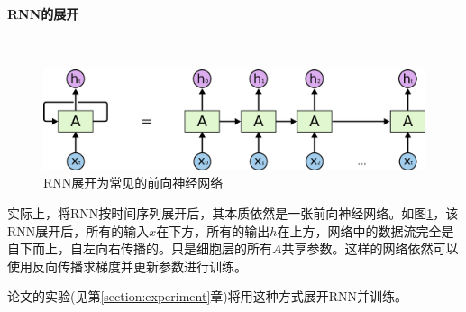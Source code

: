 \paragraph{RNN的展开}\ \par
\begin{figure}[htbp!]
    \centering
    \includegraphics[width = 1.\textwidth]{chap/img/RNN-unrolled.png}
    \caption{
        RNN展开为常见的前向神经网络\supercite{Understanding-LSTMs}
        }\label{fig:rnn_expand}
\end{figure}
\par
实际上，将RNN按时间序列展开后，其本质依然是一张前向神经网络。如图\ref{fig:rnn_expand}，该RNN展开后，所有的输入$x$在下方，所有的输出$h$在上方，网络中的数据流完全是自下而上，自左向右传播的。只是细胞层的所有$A$共享参数。这样的网络依然可以使用反向传播求梯度并更新参数进行训练。
\par
论文的实验(见第\ref{section:experiment}章)将用这种方式展开RNN并训练。
\par

